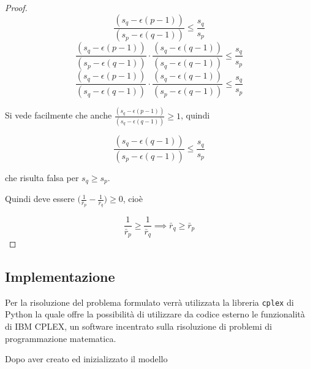 \begin{proof}
    \begin{equation*}
        \frac{(s_q - \epsilon(p-1))}
        {(s_p - \epsilon(q-1))} \leq 
        \frac{s_q}{s_p}
        \label{eq:proof}
    \end{equation*}
    \begin{equation*}
        \frac{(s_q - \epsilon(p-1))}
        {(s_p - \epsilon(q-1))}
        \cdot
        \frac{(s_q - \epsilon(q-1))}
        {(s_q - \epsilon(q-1))} \leq 
        \frac{s_q}{s_p}
        \label{eq:proof}
    \end{equation*}
    \begin{equation*}
        \frac{(s_q - \epsilon(p-1))}
        {(s_q - \epsilon(q-1))}
        \cdot
        \frac{(s_q - \epsilon(q-1))}
        {(s_p - \epsilon(q-1))} \leq 
        \frac{s_q}{s_p}
        \label{eq:proof}
    \end{equation*}
    
    Si vede facilmente che anche $
    \frac{(s_q - \epsilon(p-1))}
    {(s_q - \epsilon(q-1))} \geq 1$, quindi
    
    \begin{equation*}
        \frac{(s_q - \epsilon(q-1))}
        {(s_p - \epsilon(q-1))} \leq 
        \frac{s_q}{s_p}
        \label{eq:proof}
    \end{equation*}
    
    \noindent
    che risulta falsa per $s_q \geq s_p$. 
    
    Quindi deve essere $\bigg( \frac{1}{\bar{r}_p} - \frac{1}{\bar{r}_q} \bigg) \geq 0$, cioè
    
    \begin{equation}
        \frac{1}{\bar{r}_p} \geq \frac{1}{\bar{r}_q} \implies \bar{r}_q \geq \bar{r}_p
        \label{eq:}
    \end{equation}
    
\end{proof} 
    
\subsection{Implementazione}
\label{section:allocation_implementation}

Per la risoluzione del problema formulato verrà utilizzata la libreria \lstinline{cplex}  di Python la quale 
offre la possibilità di utilizzare da codice esterno le funzionalità di IBM CPLEX, un software 
incentrato sulla risoluzione di problemi di programmazione matematica.

Dopo aver creato ed inizializzato il modello

